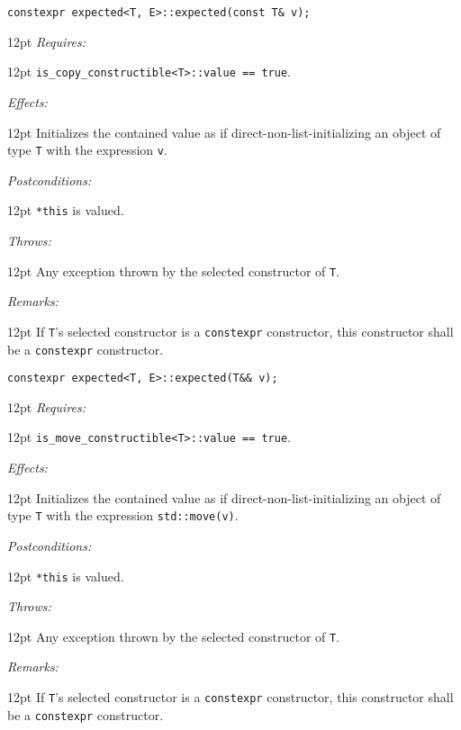 \documentclass[a4paper,10pt]{article}
\newcommand{\cpp}[1]{\lstinline{#1}}
\newcommand{\wordingItem}[1]{\noindent\textit{#1:}}
\newenvironment{wordingTextItem}[1]{\wordingItem{#1}\vspace{7pt}\noindent\begin{adjustwidth}{12pt}{}}{\vspace{7pt}\end{adjustwidth}}
\newenvironment{wordingPara}{\begin{adjustwidth}{12pt}{}}{\end{adjustwidth}}
\begin{document}
\begin{lstlisting}[xleftmargin=0pt]
constexpr expected<T, E>::expected(const T& v);
\end{lstlisting}
\begin{wordingPara}
\begin{wordingTextItem}{Requires}
\cpp{is_copy_constructible<T>::value == true}. 
\end{wordingTextItem}
\begin{wordingTextItem}{Effects}
Initializes the contained value as if direct-non-list-initializing an object of type \cpp{T} with the expression \cpp{v}.
\end{wordingTextItem}
\begin{wordingTextItem}{Postconditions}
\cpp{*this} is valued.
\end{wordingTextItem}
\begin{wordingTextItem}{Throws}
Any exception thrown by the selected constructor of \cpp{T}.
\end{wordingTextItem}
\begin{wordingTextItem}{Remarks}
If \cpp{T}'s selected constructor is a \cpp{constexpr} constructor, this constructor shall be a \cpp{constexpr} constructor.
\end{wordingTextItem}
\end{wordingPara}

\begin{lstlisting}[xleftmargin=0pt]
constexpr expected<T, E>::expected(T&& v); 
\end{lstlisting}
\begin{wordingPara}
\begin{wordingTextItem}{Requires}
\cpp{is_move_constructible<T>::value == true}.
\end{wordingTextItem}
\begin{wordingTextItem}{Effects}
Initializes the contained value as if direct-non-list-initializing an object of type \cpp{T} with the expression \cpp{std::move(v)}.
\end{wordingTextItem}
\begin{wordingTextItem}{Postconditions}
\cpp{*this} is valued.
\end{wordingTextItem}
\begin{wordingTextItem}{Throws}
Any exception thrown by the selected constructor of \cpp{T}.
\end{wordingTextItem}
\begin{wordingTextItem}{Remarks}
If \cpp{T}'s selected constructor is a \cpp{constexpr} constructor, this constructor shall be a \cpp{constexpr} constructor.
\end{wordingTextItem}
\end{wordingPara}
\end{document}
